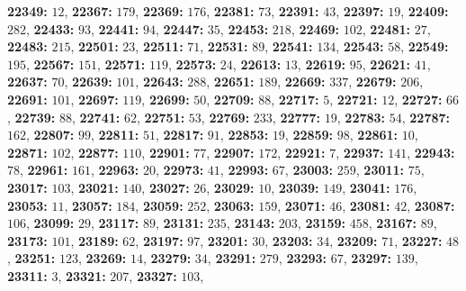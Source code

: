 \textsf{\bfseries 22349:} $12$, \textsf{\bfseries 22367:} $179$, \textsf{\bfseries 22369:} $176$, \textsf{\bfseries 22381:} $73$, \textsf{\bfseries 22391:} $43$, \textsf{\bfseries 22397:} $19$, \textsf{\bfseries 22409:} $282$, \textsf{\bfseries 22433:} $93$, \textsf{\bfseries 22441:} $94$, \textsf{\bfseries 22447:} $35$, \textsf{\bfseries 22453:} $218$, \textsf{\bfseries 22469:} $102$, \textsf{\bfseries 22481:} $27$, \textsf{\bfseries 22483:} $215$, \textsf{\bfseries 22501:} $23$, \textsf{\bfseries 22511:} $71$, \textsf{\bfseries 22531:} $89$, \textsf{\bfseries 22541:} $134$, \textsf{\bfseries 22543:} $58$, \textsf{\bfseries 22549:} $195$, \textsf{\bfseries 22567:} $151$, \textsf{\bfseries 22571:} $119$, \textsf{\bfseries 22573:} $24$, \textsf{\bfseries 22613:} $13$, \textsf{\bfseries 22619:} $95$, \textsf{\bfseries 22621:} $41$, \textsf{\bfseries 22637:} $70$, \textsf{\bfseries 22639:} $101$, \textsf{\bfseries 22643:} $288$, \textsf{\bfseries 22651:} $189$, \textsf{\bfseries 22669:} $337$, \textsf{\bfseries 22679:} $206$, \textsf{\bfseries 22691:} $101$, \textsf{\bfseries 22697:} $119$, \textsf{\bfseries 22699:} $50$, \textsf{\bfseries 22709:} $88$, \textsf{\bfseries 22717:} $5$, \textsf{\bfseries 22721:} $12$, \textsf{\bfseries 22727:} $66$, \textsf{\bfseries 22739:} $88$, \textsf{\bfseries 22741:} $62$, \textsf{\bfseries 22751:} $53$, \textsf{\bfseries 22769:} $233$, \textsf{\bfseries 22777:} $19$, \textsf{\bfseries 22783:} $54$, \textsf{\bfseries 22787:} $162$, \textsf{\bfseries 22807:} $99$, \textsf{\bfseries 22811:} $51$, \textsf{\bfseries 22817:} $91$, \textsf{\bfseries 22853:} $19$, \textsf{\bfseries 22859:} $98$, \textsf{\bfseries 22861:} $10$, \textsf{\bfseries 22871:} $102$, \textsf{\bfseries 22877:} $110$, \textsf{\bfseries 22901:} $77$, \textsf{\bfseries 22907:} $172$, \textsf{\bfseries 22921:} $7$, \textsf{\bfseries 22937:} $141$, \textsf{\bfseries 22943:} $78$, \textsf{\bfseries 22961:} $161$, \textsf{\bfseries 22963:} $20$, \textsf{\bfseries 22973:} $41$, \textsf{\bfseries 22993:} $67$, \textsf{\bfseries 23003:} $259$, \textsf{\bfseries 23011:} $75$, \textsf{\bfseries 23017:} $103$, \textsf{\bfseries 23021:} $140$, \textsf{\bfseries 23027:} $26$, \textsf{\bfseries 23029:} $10$, \textsf{\bfseries 23039:} $149$, \textsf{\bfseries 23041:} $176$, \textsf{\bfseries 23053:} $11$, \textsf{\bfseries 23057:} $184$, \textsf{\bfseries 23059:} $252$, \textsf{\bfseries 23063:} $159$, \textsf{\bfseries 23071:} $46$, \textsf{\bfseries 23081:} $42$, \textsf{\bfseries 23087:} $106$, \textsf{\bfseries 23099:} $29$, \textsf{\bfseries 23117:} $89$, \textsf{\bfseries 23131:} $235$, \textsf{\bfseries 23143:} $203$, \textsf{\bfseries 23159:} $458$, \textsf{\bfseries 23167:} $89$, \textsf{\bfseries 23173:} $101$, \textsf{\bfseries 23189:} $62$, \textsf{\bfseries 23197:} $97$, \textsf{\bfseries 23201:} $30$, \textsf{\bfseries 23203:} $34$, \textsf{\bfseries 23209:} $71$, \textsf{\bfseries 23227:} $48$, \textsf{\bfseries 23251:} $123$, \textsf{\bfseries 23269:} $14$, \textsf{\bfseries 23279:} $34$, \textsf{\bfseries 23291:} $279$, \textsf{\bfseries 23293:} $67$, \textsf{\bfseries 23297:} $139$, \textsf{\bfseries 23311:} $3$, \textsf{\bfseries 23321:} $207$, \textsf{\bfseries 23327:} $103$, 
